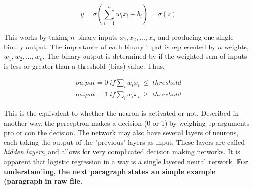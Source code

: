 \documentclass[a4paper,11pt,twocolumn]{article}
\begin{document}
\begin{equation}
y = \sigma (\sum\limits_{i=1}^n w_ix_i + b_i) = \sigma (z)
\label{neu1}
\end{equation}

This works by taking $n$ binary inputs $x_1,x_2,...,x_n$ and producing one single binary output. The importance of each binary input is represented by $n$ weights, $w_1,w_2,...,w_n$. The binary output is determined by if the weighted sum of inputs is less or greater than a threshold (bias) value. Thus,

\begin{equation*}
\begin{aligned}
output = 0 \ if \sum_i w_ix_i \ \leq \ threshold \\
output = 1 \ if \sum_i w_ix_i \ \geq \ threshold
\end{aligned}
\end{equation*}

This is the equivalent to whether the neuron is activated or not. Described in another way, the perceptron makes a decision (0 or 1) by weighing up arguments pro or con the decision. The network may also have several layers of neurons, each taking the output of the "previous" layers as input. These layers are called \textit{hidden layers}, and allows for very complicated decision making networks. It is apparent that logistic regression in a way is a single layered neural network. \textbf{For understanding, the next paragraph states an simple example (paragraph in raw file.}
\\ 

\end{document}
